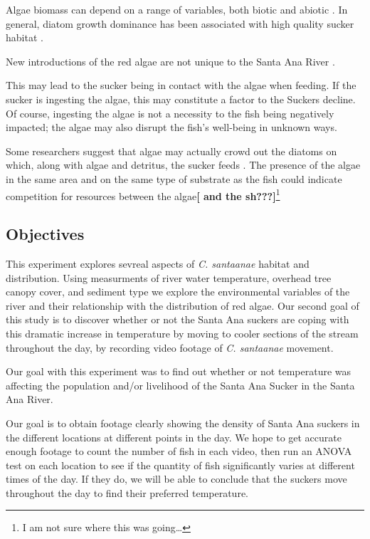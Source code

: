 \documentclass{article}\usepackage[]{graphicx}\usepackage[]{color}
\begin{document}
Algae biomass can depend on a range of variables, both biotic and abiotic \citep{winkelmann2014top}. In general, diatom growth dominance has been associated with high quality sucker habitat \citep{REF}. 

New introductions of the red algae are not unique to the Santa Ana River \citep{vzakova2013new}.

This may lead to the sucker being in contact with the algae when feeding. If the sucker is ingesting the algae, this may constitute a factor to the Suckers decline. Of course, ingesting the algae is not a necessity to the fish being negatively impacted; the algae may also disrupt the fish's well-being in unknown ways. 

Some researchers suggest that algae may actually crowd out the diatoms on which, along with algae and detritus, the sucker feeds \citep{thompson2010influence}. The presence of the algae in the same area and on the same type of substrate as the fish could indicate competition for resources between the algae\textbf{[ and the sh???]}\footnote{I am not sure where this was going\ldots}


\subsection{Objectives}
This experiment explores sevreal aspects of \emph{C. santaanae} habitat and distribution. Using measurments of river water temperature, overhead tree canopy cover, and sediment type we explore the environmental variables of the river and their relationship with the distribution of red algae. Our second goal of this study is to discover whether or not the Santa Ana suckers are coping with this dramatic increase in temperature by moving to cooler sections of the stream throughout the day, by recording video footage of \emph{C. santaanae} movement. 

Our goal with this experiment was to find out whether or not temperature was affecting the population and/or livelihood of the Santa Ana Sucker in the Santa Ana River.

Our goal is to obtain footage clearly showing the density of Santa Ana suckers in the different locations at different points in the day.  We hope to get accurate enough footage to count the number of fish in each video, then run an ANOVA test on each location to see if the quantity of fish significantly varies at different times of the day.  If they do, we will be able to conclude that the suckers move throughout the day to find their preferred temperature.
\end{document}
